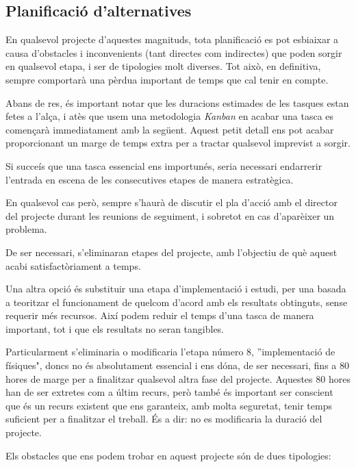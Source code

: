 \documentclass[a4paper]{article} %
\begin{document}
	\subsection{Planificació d'alternatives} \label{section:alternatives}
	En qualsevol projecte d'aquestes magnituds, tota planificació es pot esbiaixar a causa d'obstacles i inconvenients (tant directes com indirectes) que poden sorgir en qualsevol etapa, i ser de tipologies molt diverses. Tot això, en definitiva, sempre comportarà una pèrdua important de temps que cal tenir en compte. \par
	Abans de res, és important notar que les duracions estimades de les tasques estan fetes a l'alça, i atès que usem una metodologia \textit{Kanban} en acabar una tasca es començarà immediatament amb la següent. Aquest petit detall ens pot acabar proporcionant un marge de temps extra per a tractar qualsevol imprevist a sorgir.\par
	Si succeís que una tasca essencial ens importunés, seria necessari endarrerir l'entrada en escena de les consecutives etapes de manera estratègica. \par
	En qualsevol cas però, sempre s'haurà de discutir el pla d'acció amb el director del projecte durant les reunions de seguiment, i sobretot en cas d'aparèixer un problema.\par
	De ser necessari, s'eliminaran etapes del projecte, amb l'objectiu de què aquest acabi satisfactòriament a temps. \par
	Una altra opció és substituir una etapa d'implementació i estudi, per una basada a teoritzar el funcionament de quelcom d'acord amb els resultats obtinguts, sense requerir més recursos. Així podem reduir el temps d'una tasca de manera important, tot i que els resultats no seran tangibles. \par
	Particularment s'eliminaria o modificaria l'etapa número 8, ''implementació de físiques", doncs no és absolutament essencial i ens dóna, de ser necessari, fins a 80 hores de marge per a finalitzar qualsevol altra fase del projecte. Aquestes 80 hores han de ser extretes com a últim recurs, però també és important ser conscient que és un recurs existent que ens garanteix, amb molta seguretat, tenir temps suficient per a finalitzar el treball. És a dir: no es modificaria la duració del projecte. \par
	Els obstacles que ens podem trobar en aquest projecte són de dues tipologies:
\end{document}
